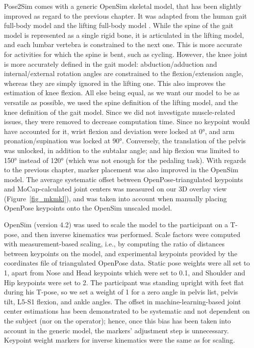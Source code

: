 Pose2Sim comes with a generic OpenSim skeletal model, that has been slightly improved as regard to the previous chapter. It was adapted from the human gait full-body model \cite{Rajagopal2016} and the lifting full-body model \cite{Beaucage-Gauvreau2019}. While the spine of the gait model is represented as a single rigid bone, it is articulated in the lifting model, and each lumbar vertebra is constrained to the next one. This is more accurate for activities for which the spine is bent, such as cycling. However, the knee joint is more accurately defined in the gait model: abduction/adduction and internal/external rotation angles are constrained to the flexion/extension angle, whereas they are simply ignored in the lifting one. This also improves the estimation of knee flexion. All else being equal, as we want our model to be as versatile as possible, we used the spine definition of the lifting model, and the knee definition of the gait model. Since we did not investigate muscle-related issues, they were removed to decrease computation time. Since no keypoint would have accounted for it, wrist flexion and deviation were locked at 0°, and arm pronation/supination was locked at 90°. Conversely, the translation of the pelvis was unlocked, in addition to the subtalar angle; and hip flexion was limited to 150° instead of 120° (which was not enough for the pedaling task). With regards to the previous chapter, marker placement was also improved in the OpenSim model. The average systematic offset between OpenPose-triangulated keypoints and MoCap-calculated joint centers was measured on our 3D overlay view (Figure~\ref{fig_mkmkl}), and was taken into account when manually placing OpenPose keypoints onto the OpenSim unscaled model.

OpenSim (version 4.2) was used to scale the model to the participant on a T-pose, and then inverse kinematics was performed. Scale factors were computed with measurement-based scaling, i.e., by computing the ratio of distances between keypoints on the model, and experimental keypoints provided by the coordinates file of triangulated OpenPose data. Static pose weights were all set to 1, apart from Nose and Head keypoints which were set to 0.1, and Shoulder and Hip keypoints were set to 2. The participant was standing upright with feet flat during his T-pose, so we set a weight of 1 for a zero angle in pelvis list, pelvis tilt, L5-S1 flexion, and ankle angles. The offset in machine-learning-based joint center estimations has been demonstrated to be systematic and not dependent on the subject \cite{Needham2021b} (nor on the operator); hence, once this bias has been taken into account in the generic model, the markers’ adjustment step is unnecessary. Keypoint weight markers for inverse kinematics were the same as for scaling.


